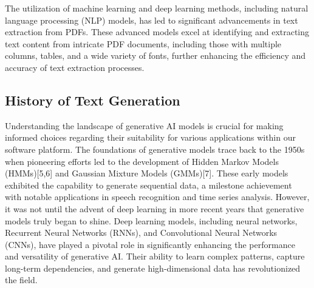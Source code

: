 \documentclass[conference]{IEEEtran}
\begin{document}
The utilization of machine learning and deep learning methods, including natural language processing (NLP) models, has led to significant advancements in text extraction from PDFs. These advanced models excel at identifying and extracting text content from intricate PDF documents, including those with multiple columns, tables, and a wide variety of fonts, further enhancing the efficiency and accuracy of text extraction processes.

\subsection{History of Text Generation}

Understanding the landscape of generative AI models is crucial for making informed choices regarding their suitability for various applications within our software platform. The foundations of generative models trace back to the 1950s when pioneering efforts led to the development of Hidden Markov Models (HMMs)[5,6] and Gaussian Mixture Models (GMMs)[7]. These early models exhibited the capability to generate sequential data, a milestone achievement with notable applications in speech recognition and time series analysis. However, it was not until the advent of deep learning in more recent years that generative models truly began to shine. Deep learning models, including neural networks, Recurrent Neural Networks (RNNs), and Convolutional Neural Networks (CNNs), have played a pivotal role in significantly enhancing the performance and versatility of generative AI. Their ability to learn complex patterns, capture long-term dependencies, and generate high-dimensional data has revolutionized the field.
\end{document}
